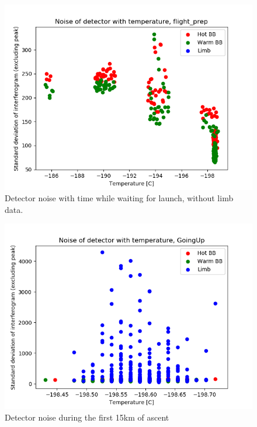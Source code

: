 \begin{figure}
\centering
  \includegraphics[width=0.8\linewidth]{mct_noise_temp_plots/flight_prep_noisevstemp_invertedx_colours_no_limb.png}
  \caption{Detector noise with time while waiting for launch, without limb data.}
  \label{fig:flightprep_nolimb_noise}
\end{figure}

\begin{figure}
\centering
  \includegraphics[width=0.8\linewidth]{mct_noise_temp_plots/goingup_noisevtemp_invertedx_colours.png}
  \caption{Detector noise during the first 15km of ascent}
  \label{fig:ascent_pt1_noise}
\end{figure}

